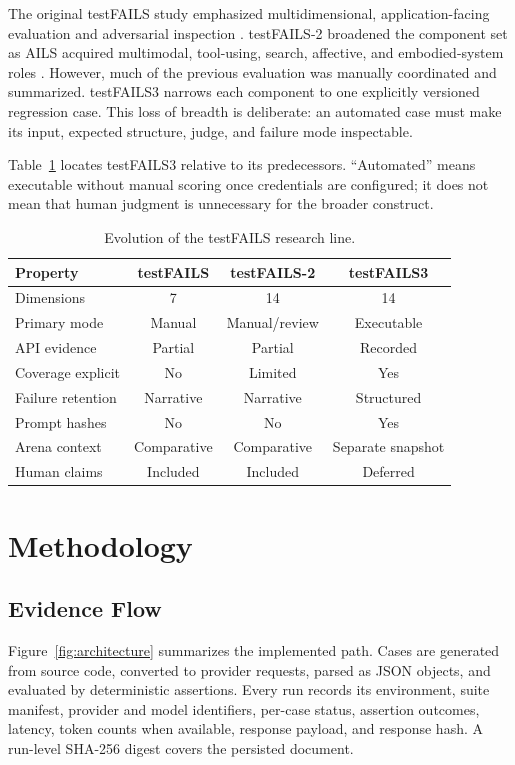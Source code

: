 \documentclass[10pt,twocolumn]{article}
\newcommand{\system}{testFAILS3}
\begin{document}
The original testFAILS study emphasized multidimensional, application-facing evaluation and adversarial inspection \cite{kumar2023testfails}. testFAILS-2 broadened the component set as AILS acquired multimodal, tool-using, search, affective, and embodied-system roles \cite{kumar2024testfails2}. However, much of the previous evaluation was manually coordinated and summarized. \system{} narrows each component to one explicitly versioned regression case. This loss of breadth is deliberate: an automated case must make its input, expected structure, judge, and failure mode inspectable.

Table~\ref{tab:comparison} locates \system{} relative to its predecessors. ``Automated'' means executable without manual scoring once credentials are configured; it does not mean that human judgment is unnecessary for the broader construct.

\begin{table}[t]
\caption{Evolution of the testFAILS research line.}
\label{tab:comparison}
\centering
\footnotesize
\begin{tabularx}{\columnwidth}{@{}Xccc@{}}
\toprule
Property & testFAILS & testFAILS-2 & \system{} \\
\midrule
Dimensions & 7 & 14 & 14 \\
Primary mode & Manual & Manual/review & Executable \\
API evidence & Partial & Partial & Recorded \\
Coverage explicit & No & Limited & Yes \\
Failure retention & Narrative & Narrative & Structured \\
Prompt hashes & No & No & Yes \\
Arena context & Comparative & Comparative & Separate snapshot \\
Human claims & Included & Included & Deferred \\
\bottomrule
\end{tabularx}
\end{table}

\section{Methodology}
\subsection{Evidence Flow}
Figure~\ref{fig:architecture} summarizes the implemented path. Cases are generated from source code, converted to provider requests, parsed as JSON objects, and evaluated by deterministic assertions. Every run records its environment, suite manifest, provider and model identifiers, per-case status, assertion outcomes, latency, token counts when available, response payload, and response hash. A run-level SHA-256 digest covers the persisted document.
\end{document}
